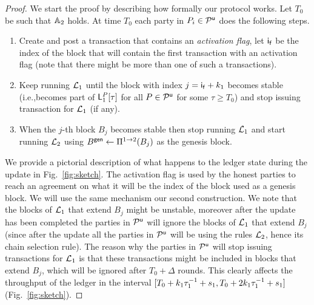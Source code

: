 \begin{proof}
We start the proof by describing how formally our protocol works.
Let $T_0$ be such that $\mathbb{A}_2$ holds. At time $T_0$ each party in $P_i\in \mathcal{P}^\mathsf{u}$ does the following steps.

\begin{enumerate}
	\item Create and post a transaction that contains an \emph{activation flag}, let $\mathsf{i_f}$ be the index of the block that will contain the first transaction with an activation flag (note that there might be more than one of such a transactions).
	\item Keep running $\mathcal{L}_1$ until the block with index  $j=\mathsf{i_f}+k_1$ becomes stable (i.e.,becomes part of $\mathsf{L}_1^{P}[\tau]$ for all $P\in\mathcal{P}^\mathsf{u}$ for some $\tau \geq T_0$) and stop issuing transaction for $\mathcal{L}_1$ (if any).
	\item When the $j$-th block $B_{j}$  becomes stable then stop running $\mathcal{L}_1$ and start running 
	$\mathcal{L}_2$ using $B^\mathsf{gen}\leftarrow\Pi^{1\rightarrow 2}(B_{j})$ as the genesis block.
	
\end{enumerate}


We provide a pictorial description of what happens to the ledger state during the update in Fig.~\ref{fig:sketch}.
The activation flag is used by the honest parties to reach an agreement on what it will be the index of the block used as a genesis block. We will use the same mechanism our second construction. We note that the blocks of $\mathcal{L}_1$ that extend $B_j$ might be unstable, moreover after the update has been 
completed the parties in $\mathcal{P}^\mathsf{u}$ will ignore the blocks of $\mathcal{L}_1$ that extend $B_j$ (since after the update all the parties in $\mathcal{P}^\mathsf{u}$ will be using the rules $\mathcal{L}_2$, hence its chain selection rule).  The reason why the parties in $\mathcal{P}^\mathsf{u}$ will stop issuing transactions for $\mathcal{L}_1$ is that these transactions might be included in blocks that extend $B_j$, which will be ignored after $T_0+\Delta$ rounds. This clearly affects the throughput of the ledger in the interval $[T_0+k_1 \tau_1^{-1}+s_1, T_0+2k_1 \tau_1^{-1}+s_1]$ (Fig.~\ref{fig:sketch}).


\end{proof}
